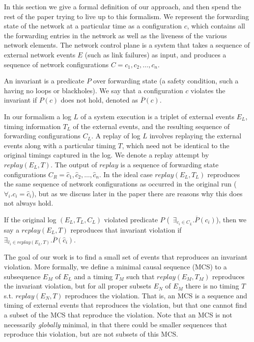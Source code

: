 In this section we give a formal definition of our approach, and then spend the rest of the paper trying to live up to this formalism. We represent the forwarding state of the network
at a particular time as a configuration $c$, which contains all the forwarding
entries in the network
as well as the liveness of the various network elements.
The network control plane is a system that takes a sequence of
external network events $E$ (such as link failures) as input,
and produces a sequence of network configurations
$C = c_1,c_2,\dots,c_n$.

An invariant is a predicate $P$ over forwarding state (a safety
condition, such a having no loops or blackholes). We say that a configuration
$c$ violates the invariant if $P(c)$ does not
hold, denoted as $\overline{P}(c)$.

In our formalism a log $L$ of a system execution is a triplet of external events $E_L$,
timing information $T_L$ of the external events, and the resulting sequence of forwarding
configurations $C_L$.
A replay of log $L$ involves replaying the external events along with a
particular timing $T$,
which need not be identical to the original timings captured in the log.
We denote a replay attempt by $replay(E_L,T)$.
The output of $replay$ is a sequence of forwarding state configurations
$C_R = \hat{c}_1,\hat{c}_2,\dots,\hat{c}_n$. In the ideal case $replay(E_L,T_L)$ reproduces the same
sequence of network configurations as occurred in the original run
(\ie~$\forall_i. c_i = \hat{c}_i$), but as we discuss later in the paper there are reasons why
this does not always hold.

If the original log $(E_L, T_L, C_L)$ violated predicate $P$
(\ie~$\exists_{c_i \in C_L}. \overline{P}(c_i)$),
then we say a $replay(E_L,T)$ reproduces that invariant violation if
$\exists_{\hat{c}_i \in replay(E_L,T)}. \overline{P}(\hat{c}_i)$.

The goal of our work is to find a small set of events that reproduces an invariant violation.  More formally, we define a minimal causal sequence (MCS) to a subsequence $E_M$
of $E_L$ and a timing $T_M$ such
that $replay(E_M,T_M)$ reproduces the invariant violation, but for all proper
subsets $E_N$ of $E_M$
there is no timing $T$ s.t. $replay(E_N,T)$ reproduces the violation. That is, an MCS is a sequence and timing of external events that reproduces the violation, but that one cannot find a subset of the MCS that reproduce the violation.  Note that an MCS is not necessarily {\em globally} minimal, in that there could be smaller sequences that reproduce this violation, but are not subsets of this MCS.

